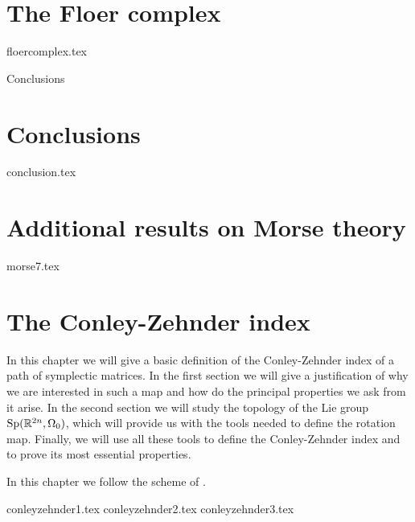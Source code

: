 \documentclass[a4paper,11pt]{book}
\begin{document}
\chapter{The Floer complex}
{floercomplex.tex}

Conclusions
\chapter*{Conclusions}
{conclusion.tex}

\begin{appendices}
\chapter{Additional results on Morse theory}
{morse7.tex}

\chapter{The Conley-Zehnder index} \label{chapter:conley_zehnder}

In this chapter we will give a basic definition of the Conley-Zehnder index of a path of symplectic matrices. In the first section we will give a justification of why we are interested in such a map and how do the principal properties we ask from it arise. In the second section we will study the topology of the Lie group $\mathrm{Sp}(\mathbb{R}^{2n},\Omega_0)$, which will provide us with the tools needed to define the rotation map. Finally, we will use all these tools to define the Conley-Zehnder index and to prove its most essential properties.

In this chapter we follow the scheme of \cite{gutt2012conley}.

{conleyzehnder1.tex}
{conleyzehnder2.tex}
{conleyzehnder3.tex}
\end{appendices}



\end{document}

